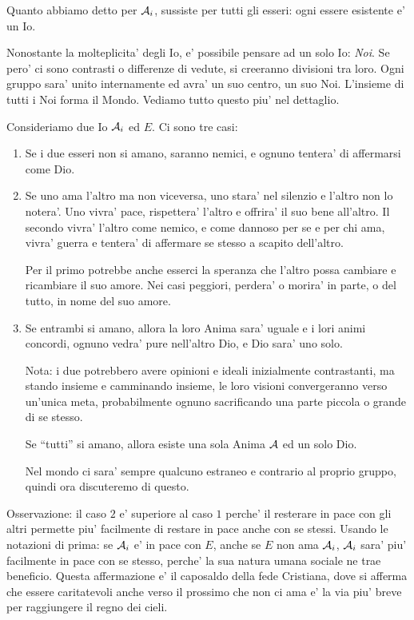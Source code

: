     Quanto abbiamo detto per $\mathcal{A}_i$, sussiste per tutti gli esseri: ogni essere esistente e' un Io.

    Nonostante la molteplicita' degli Io, e' possibile pensare ad un solo Io: \emph{Noi}. Se pero' ci sono contrasti o differenze di vedute, si creeranno divisioni tra loro. Ogni gruppo sara' unito internamente ed avra' un suo centro, un suo Noi. L'insieme di tutti i Noi forma il Mondo. Vediamo tutto questo piu' nel dettaglio.

    Consideriamo due Io $\mathcal{A}_i$ ed $E$. Ci sono tre casi:

    \begin{enumerate}

        \item Se i due esseri non si amano, saranno nemici, e ognuno tentera' di affermarsi come Dio.

        \item Se uno ama l'altro ma non viceversa, uno stara' nel silenzio e l'altro non lo notera'. Uno vivra' pace, rispettera' l'altro e offrira' il suo bene all'altro. Il secondo vivra' l'altro come nemico, e come dannoso per se e per chi ama, vivra' guerra e tentera' di affermare se stesso a scapito dell'altro.
            
            Per il primo potrebbe anche esserci la speranza che l'altro possa cambiare e ricambiare il suo amore. Nei casi peggiori, perdera' o morira' in parte, o del tutto, in nome del suo amore.

        \item Se entrambi si amano, allora la loro Anima sara' uguale e i lori animi concordi, ognuno vedra' pure nell'altro Dio, e Dio sara' uno solo.

                Nota: i due potrebbero avere opinioni e ideali inizialmente contrastanti, ma stando insieme e camminando insieme, le loro visioni convergeranno verso un'unica meta, probabilmente ognuno sacrificando una parte piccola o grande di se stesso.

                Se ``tutti'' si amano, allora esiste una sola Anima $\mathcal{A}$ ed un solo Dio.

                Nel mondo ci sara' sempre qualcuno estraneo e contrario al proprio gruppo, quindi ora discuteremo di questo.
    \end{enumerate}

Osservazione: il caso $2$ e' superiore al caso $1$ perche' il resterare in pace con gli altri permette piu' facilmente di restare in pace anche con se stessi. Usando le notazioni di prima: se $\mathcal{A}_i$ e' in pace con $E$, anche se $E$ non ama $\mathcal{A}_i$, $\mathcal{A}_i$ sara' piu' facilmente in pace con se stesso, perche' la sua natura umana sociale ne trae beneficio.
Questa affermazione e' il caposaldo della fede Cristiana, dove si afferma che essere caritatevoli anche verso il prossimo che non ci ama e' la via piu' breve per raggiungere il regno dei cieli.

